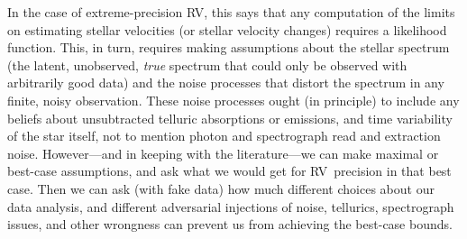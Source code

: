 \documentclass[modern]{aastex61}
\newcommand{\acronym}[1]{{\small{#1}}}
\newcommand{\RV}{\acronym{RV}}
\begin{document}
In the case of extreme-precision \RV, this says that any computation of the limits
on estimating stellar velocities (or stellar velocity changes)
requires a likelihood function.
This, in turn, requires making assumptions about the stellar spectrum (the
latent, unobserved, \emph{true} spectrum that could only be observed
with arbitrarily good data) and the noise processes that distort the
spectrum in any finite, noisy observation.
These noise processes ought (in principle) to include any beliefs about
unsubtracted telluric absorptions or emissions, and time variability
of the star itself, not to mention photon and spectrograph read and
extraction noise.
However---and in keeping with the literature---we can make maximal or
best-case assumptions, and ask what we would get for \RV\ precision
in that best case.
Then we can ask (with fake data) how much different choices about our
data analysis, and different adversarial injections of noise,
tellurics, spectrograph issues, and other wrongness can prevent us
from achieving the best-case bounds.
\end{document}
